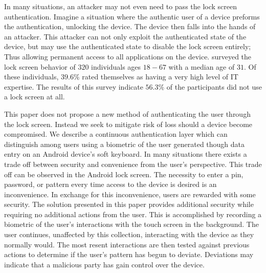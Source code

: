 In many situations,
an attacker may not even need to pass the lock screen authentication.
Imagine a situation where the authentic user of a device preforms the authentication,
unlocking the device.
The device then falls into the hands of an attacker.
This attacker can not only exploit the authenticated state of the device,
but may use the authenticated state to disable the lock screen entirely;
Thus allowing permanent access to all applications on the device.
%
\cite{harbach2014sa} surveyed the lock screen behavior of $320$
individuals ages $18 - 67$ with a median age of $31$.
Of these individuals, $39.6\%$  rated themselves as having
a very high level of IT expertise.
The results of this survey indicate $56.3\%$ of the participants
did not use a lock screen at all.

This paper does not propose a new method of
authenticating the user through the lock screen.
Instead we seek to mitigate risk of loss should a
device become compromised.
We describe a continuous authentication
layer which can distinguish among users
using a biometric of the user
generated though data entry on an Android device's soft keyboard.
%
In many situations there exists a trade off between
security and convenience from the user's perspective.
%
This trade off can be observed in the Android lock screen.
The necessity to enter a pin, password, or pattern 
every time access to the device is desired is 
an inconvenience.
In exchange for this inconvenience,
users are rewarded with some security.
%
The solution presented in this paper
provides additional security while requiring
no additional actions from the user.
%
This is accomplished by
recording a biometric of 
the user's interactions with the touch screen
in the background.
The user continues, unaffected by this collection, 
interacting with the device as they normally would.
%
The most resent interactions are then
tested against previous actions
to determine if the user's
pattern has begun to deviate.
%
Deviations may indicate that a
malicious party has gain control over the device.

